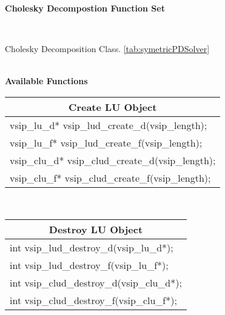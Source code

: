 \clearpage
\hypertarget{choldFunc}{\large \textbf{Cholesky Decompostion Function Set}}\vspace{.2cm}\\
\hspace*{.3cm}
\parbox{0.85\textwidth}{Cholesky Decomposition Class. \ref{tab:symetricPDSolver}}
\\\cvsiplh 
\newline \hspace*{.8cm} \vspace*{.1cm} \textbf{Available Functions }
%
\newline \hspace*{1.cm} {
\ttfamily\vspace{.3cm}
\begin{tabular}[H]{|l|}
\multicolumn{1}{c}{\rmfamily \bfseries Create LU Object\vspace{.1cm}}\\ \hline
vsip\_lu\_d* vsip\_lud\_create\_d(vsip\_length);\\
vsip\_lu\_f* vsip\_lud\_create\_f(vsip\_length);\\
vsip\_clu\_d* vsip\_clud\_create\_d(vsip\_length);\\
vsip\_clu\_f* vsip\_clud\_create\_f(vsip\_length);\\
\hline\end{tabular}\\}
%
\newline \hspace*{1.cm} {
\ttfamily\vspace{.3cm}
\begin{tabular}[H]{|l|}
\multicolumn{1}{c}{\rmfamily \bfseries Destroy LU Object\vspace{.1cm}}\\ \hline
int vsip\_lud\_destroy\_d(vsip\_lu\_d*);\\
int vsip\_lud\_destroy\_f(vsip\_lu\_f*);\\
int vsip\_clud\_destroy\_d(vsip\_clu\_d*);\\
int vsip\_clud\_destroy\_f(vsip\_clu\_f*);\\
\hline\end{tabular}\\}

